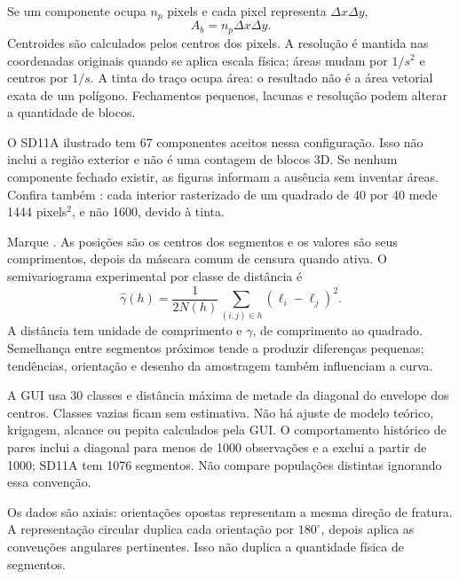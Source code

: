 Se um componente ocupa \(n_p\) pixels e cada pixel representa \(\Delta x\Delta y\),
\begin{equation}A_b=n_p\Delta x\Delta y.\end{equation}
Centroides são calculados pelos centros dos pixels. A resolução é mantida nas coordenadas originais quando se aplica escala física; áreas mudam por \(1/s^2\) e centros por \(1/s\). A tinta do traço ocupa área: o resultado não é a área vetorial exata de um polígono. Fechamentos pequenos, lacunas e resolução podem alterar a quantidade de blocos.

O SD11A ilustrado tem 67 componentes aceitos nessa configuração. Isso não inclui a região exterior e não é uma contagem de blocos 3D. Se nenhum componente fechado existir, as figuras informam a ausência sem inventar áreas. Confira também : cada interior rasterizado de um quadrado de 40 por 40 mede 1444 pixels\(^{2}\), e não 1600, devido à tinta.

Marque . As posições são os centros dos segmentos e os valores são seus comprimentos, depois da máscara comum de censura quando ativa. O semivariograma experimental por classe de distância é
\begin{equation}
\widehat\gamma(h)=\frac{1}{2N(h)}\sum_{(i,j)\in h}(\ell_i-\ell_j)^2.
\end{equation}
A distância tem unidade de comprimento e \(\gamma\), de comprimento ao quadrado. Semelhança entre segmentos próximos tende a produzir diferenças pequenas; tendências, orientação e desenho da amostragem também influenciam a curva.

A GUI usa 30 classes e distância máxima de metade da diagonal do envelope dos centros. Classes vazias ficam sem estimativa. Não há ajuste de modelo teórico, krigagem, alcance ou pepita calculados pela GUI. O comportamento histórico de pares inclui a diagonal para menos de 1000 observações e a exclui a partir de 1000; SD11A tem 1076 segmentos. Não compare populações distintas ignorando essa convenção.

\label{sec:angles}
Os dados são axiais: orientações opostas representam a mesma direção de fratura. A representação circular duplica cada orientação por \(180^\circ\), depois aplica as convenções angulares pertinentes. Isso não duplica a quantidade física de segmentos.

